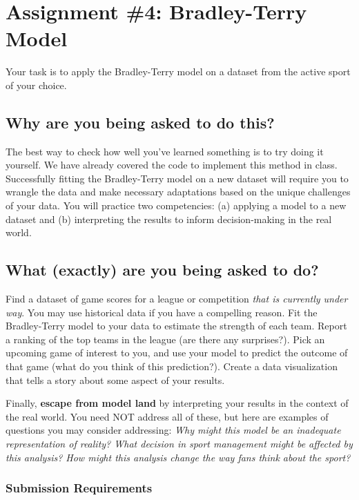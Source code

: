 \documentclass{article}
\begin{document}
  \section*{\sc Assignment \#4: Bradley-Terry Model}

    Your task is to apply the Bradley-Terry model on a dataset from the active sport of your choice.
  
    \subsection*{\sc Why are you being asked to do this?}

      The best way to check how well you've learned something is to try doing it yourself. We have already covered the code to implement this method in class. Successfully fitting the Bradley-Terry model on a new dataset will require you to wrangle the data and make necessary adaptations based on the unique challenges of your data. You will practice two competencies: (a) applying a model to a new dataset and (b) interpreting the results to inform decision-making in the real world.

    \subsection*{\sc What (exactly) are you being asked to do?}

      Find a dataset of game scores for a league or competition {\it that is currently under way}. You may use historical data if you have a compelling reason. Fit the Bradley-Terry model to your data to estimate the strength of each team. Report a ranking of the top teams in the league (are there any surprises?). Pick an upcoming game of interest to you, and use your model to predict the outcome of that game (what do you think of this prediction?). Create a data visualization that tells a story about some aspect of your results.

      Finally, {\bf escape from model land} by interpreting your results in the context of the real world. You need NOT address all of these, but here are examples of questions you may consider addressing: {\it Why might this model be an inadequate representation of reality? What decision in sport management might be affected by this analysis? How might this analysis change the way fans think about the sport?}

      \subsubsection*{\sc Submission Requirements}
\end{document}
